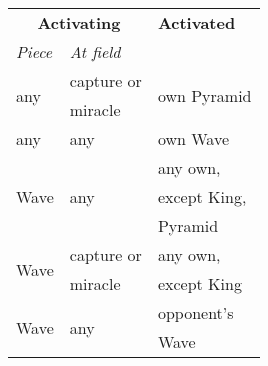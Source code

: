 \begin{table}[!h]
\centering
\begin{tabular}{ lll }
\toprule %
\multicolumn{2}{c}{ \textbf{Activating} }                               & \textbf{Activated}            \\
\cmidrule{1-2} %
\emph{Piece}                            & \emph{At field}               &                               \\
\midrule %
\multirow{2}{*}{any}                    & capture or                    & \multirow{2}{*}{own Pyramid}  \\
                                        & miracle                       &                               \\
\cmidrule{1-3} %
any                                     & any                           & own Wave                      \\
\cmidrule{1-3} %
\multirow{3}{*}{Wave}                   & \multirow{3}{*}{any}          & any own,                      \\
                                        &                               & except King,                  \\
                                        &                               & Pyramid                       \\
\cmidrule{1-3} %
\multirow{2}{*}{Wave\footnotemark[1]}   & capture or                    & any own,                      \\
                                        & miracle                       & except King                   \\
\cmidrule{1-3} %
\multirow{2}{*}{Wave}                   & \multirow{2}{*}{any}          & opponent's                    \\
                                        &                               & Wave                          \\

\end{tabular}
\end{table}

